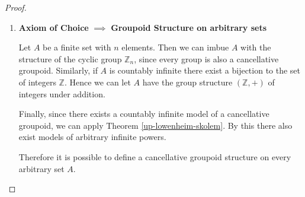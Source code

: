 \documentclass[../../main.tex]{subfiles}
\begin{document}
\begin{proof}
\begin{enumerate}
        \item \textbf{Axiom of Choice} $\implies$ \textbf{Groupoid Structure on arbitrary sets}
        
        Let $A$ be a finite set with $n$ elements.
        Then we can imbue $A$ with the structure of the cyclic group $\mathbb{Z}_n$, since every group is also a cancellative groupoid.
        Similarly, if $A$ is countably infinite there exist a bijection to the set of integers $\mathbb{Z}$.
        Hence we can let $A$ have the group structure $\left(\mathbb{Z}, +\right)$ of integers under addition.

        Finally, since there exists a countably infinite model of a cancellative groupoid, we can apply Theorem \ref{up-lowenheim-skolem}.
        By this there also exist models of arbitrary infinite powers.

        Therefore it is possible to define a cancellative groupoid structure on every arbitrary set $A$. \qedhere
    \end{enumerate}
\end{proof}
\end{document}
